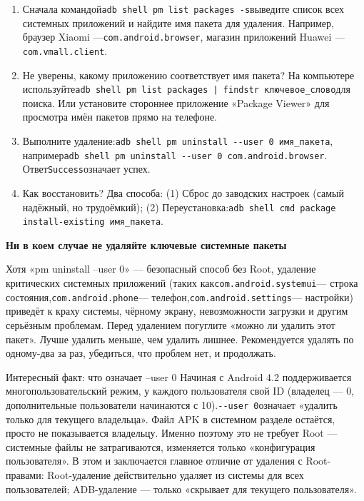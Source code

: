 \begin{enumerate}
  \item Сначала командой\texttt{adb shell pm list packages -\allowbreak s}выведите список всех системных приложений и найдите имя пакета для удаления. Например, браузер Xiaomi —\texttt{com.\allowbreak android.\allowbreak browser}, магазин приложений Huawei —\texttt{com.\allowbreak vmall.\allowbreak client}.
  \item Не уверены, какому приложению соответствует имя пакета? На компьютере используйте\texttt{adb shell pm list packages | findstr ключевое\_слово}для поиска. Или установите стороннее приложение «Package Viewer» для просмотра имён пакетов прямо на телефоне.
  \item Выполните удаление:\texttt{adb shell pm uninstall -\allowbreak -\allowbreak user 0 имя\_пакета}, например\texttt{adb shell pm uninstall -\allowbreak -\allowbreak user 0 com.\allowbreak android.\allowbreak browser}. Ответ\texttt{Success}означает успех.
  \item Как восстановить? Два способа: (1) Сброс до заводских настроек (самый надёжный, но трудоёмкий); (2) Переустановка:\texttt{adb shell cmd package install-\allowbreak existing имя\_пакета}.
\end{enumerate}

\textbf{Ни в коем случае не удаляйте ключевые системные пакеты}\par

Хотя «pm uninstall --user 0» — безопасный способ без Root, удаление критических системных приложений (таких как\texttt{com.\allowbreak android.\allowbreak systemui}— строка состояния,\texttt{com.\allowbreak android.\allowbreak phone}— телефон,\texttt{com.\allowbreak android.\allowbreak settings}— настройки) приведёт к краху системы, чёрному экрану, невозможности загрузки и другим серьёзным проблемам. Перед удалением погуглите «можно ли удалить этот пакет». Лучше удалить меньше, чем удалить лишнее. Рекомендуется удалять по одному-два за раз, убедиться, что проблем нет, и продолжать.

\begin{tcbinfo}{Интересный факт: что означает --user 0}
Начиная с Android 4.2 поддерживается многопользовательский режим, у каждого пользователя свой ID (владелец — 0, дополнительные пользователи начинаются с 10).\texttt{-\allowbreak -\allowbreak user 0}означает «удалить только для текущего владельца». Файл APK в системном разделе остаётся, просто не показывается владельцу. Именно поэтому это не требует Root — системные файлы не затрагиваются, изменяется только «конфигурация пользователя». В этом и заключается главное отличие от удаления с Root-правами: Root-удаление действительно удаляет из системы для всех пользователей; ADB-удаление — только «скрывает для текущего пользователя».

\end{tcbinfo}

